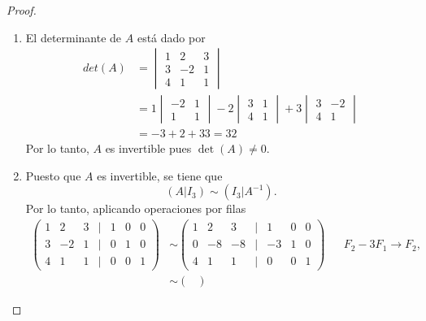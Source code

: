\documentclass[11pt]{article}
\begin{document}
\begin{proof}\hspace{0pt}
    \begin{enumerate}[leftmargin=*,label=\textit{\alph*})]
    \item El determinante de $A$ está dado por 
    \begin{align*}
        det(A) & =\begin{vmatrix}
            1 & 2 & 3 \\
            3 &-2 & 1 \\
            4 & 1 & 1
        \end{vmatrix} \\
        & = 1 \begin{vmatrix}
                -2 & 1 \\
                1 & 1
                \end{vmatrix}-2\begin{vmatrix}
                3 & 1 \\
                4 & 1
                \end{vmatrix} + 3 \begin{vmatrix}
                    3 & -2 \\
                    4 & 1
                \end{vmatrix}\\
        & = -3 + 2 + 33 = 32
    \end{align*}
    Por lo tanto, $A$ es invertible pues $\det(A)\neq 0$.
    \item
    Puesto que $A$ es invertible, se tiene que 
    \[
        (A|I_3)\sim (I_3|A^{-1}).
    \]
    Por lo tanto, aplicando operaciones por filas
    \begin{align*}
        \begin{pmatrix}
            1 & 2 & 3 & | & 1 & 0 & 0\\[0.75em]
            3 & -2 & 1 & | & 0 & 1 & 0\\[0.75em]
            4 & 1 & 1 & | & 0 & 0 & 1
        \end{pmatrix}& \sim \begin{pmatrix}
            1 & 2 & 3 & | & 1 & 0 & 0\\[0.75em]
            0 & -8 & -8 & | & -3 & 1 & 0\\[0.75em]
            4 & 1 & 1 & | & 0 & 0 & 1
        \end{pmatrix} && F_2 - 3F_1 \rightarrow F_2,  \\[0.25em]
            &\sim \begin{pmatrix}

\end{pmatrix}
\end{align*}
\end{enumerate}
\end{proof}
\end{document}

